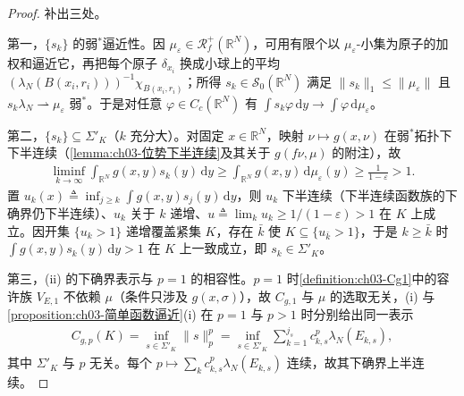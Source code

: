 \documentclass[../../main.tex]{subfiles}%
\begin{document}
\begin{proof}
补出三处。

第一，$\{s_k\}$ 的弱$^*$逼近性。因 $\mu_\varepsilon\in\mathscr{R}^+_f(\mathbb{R}^N)$，可用有限个以 $\mu_\varepsilon$-小集为原子的加权和逼近它，再把每个原子 $\delta_{x_i}$ 换成小球上的平均 $(\lambda_N(B(x_i,r_i)))^{-1}\chi_{B(x_i,r_i)}$；所得 $s_k\in\mathscr S_0(\mathbb{R}^N)$ 满足 $\|s_k\|_1\leqslant\|\mu_\varepsilon\|$ 且 $s_k\lambda_N\rightharpoonup\mu_\varepsilon$ 弱$^*$。于是对任意 $\varphi\in C_c(\mathbb{R}^N)$ 有 $\int s_k\varphi\,\mathrm{d}y\to\int\varphi\,\mathrm{d}\mu_\varepsilon$。

第二，$\{s_k\}\subseteq\Sigma'_K$（$k$ 充分大）。对固定 $x\in\mathbb{R}^N$，映射 $\nu\mapsto g(x,\nu)$ 在弱$^*$拓扑下下半连续（\cref{lemma:ch03-位势下半连续}及其关于 $g(f\nu,\mu)$ 的附注），故
\begin{align*}
\liminf_{k\to\infty}\int_{\mathbb{R}^N}g(x,y)s_k(y)\,\mathrm{d}y\geqslant\int_{\mathbb{R}^N}g(x,y)\,\mathrm{d}\mu_\varepsilon(y)\geqslant\frac{1}{1-\varepsilon}>1 .
\end{align*}
置 $u_k(x)\triangleq\inf_{j\geqslant k}\int g(x,y)s_j(y)\,\mathrm{d}y$，则 $u_k$ 下半连续（下半连续函数族的下确界仍下半连续）、$u_k$ 关于 $k$ 递增、$u\triangleq\lim_ku_k\geqslant1/(1-\varepsilon)>1$ 在 $K$ 上成立。因开集 $\{u_k>1\}$ 递增覆盖紧集 $K$，存在 $\bar k$ 使 $K\subseteq\{u_{\bar k}>1\}$，于是 $k\geqslant\bar k$ 时 $\int g(x,y)s_k(y)\,\mathrm{d}y>1$ 在 $K$ 上一致成立，即 $s_k\in\Sigma'_K$。

第三，(ii) 的下确界表示与 $p=1$ 的相容性。$p=1$ 时\cref{definition:ch03-Cg1}中的容许族 $V_{E,1}$ 不依赖 $\mu$（条件只涉及 $g(x,\sigma)$），故 $C_{g,1}$ 与 $\mu$ 的选取无关，(i) 与\cref{proposition:ch03-简单函数逼近}(i) 在 $p=1$ 与 $p>1$ 时分别给出同一表示
\begin{align*}
C_{g,p}(K)=\inf_{s\in\Sigma'_K}\|s\|_p^p=\inf_{s\in\Sigma'_K}\sum_{k=1}^{j_s}c_{k,s}^p\lambda_N(E_{k,s}),
\end{align*}
其中 $\Sigma'_K$ 与 $p$ 无关。每个 $p\mapsto\sum_kc_{k,s}^p\lambda_N(E_{k,s})$ 连续，故其下确界上半连续。
\end{proof}
\end{document}

